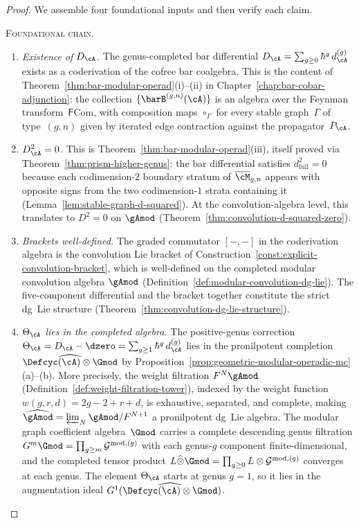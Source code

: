 \begin{proof}
We assemble four foundational inputs and then verify each
claim.

\medskip\noindent
\textsc{Foundational chain.}
\begin{enumerate}[label=\textup{(F\arabic*)}]
\item \emph{Existence of $D_\cA$.}
  The genus-completed bar differential
  $D_\cA = \sum_{g \geq 0} \hbar^g\, d_\cA^{(g)}$ exists as a
  coderivation of the cofree bar coalgebra.  This is the content
  of Theorem~\ref{thm:bar-modular-operad}(i)--(ii) in
  Chapter~\ref{chap:bar-cobar-adjunction}: the collection
  $\{\barB^{(g,n)}(\cA)\}$ is an algebra over the Feynman
  transform~$\mathsf{F}\mathrm{Com}$, with composition maps
  $\circ_\Gamma$ for every stable graph~$\Gamma$ of
  type~$(g,n)$ given by iterated edge contraction against
  the propagator~$P_\cA$.
\item \emph{$D_\cA^2 = 0$.}
  This is Theorem~\ref{thm:bar-modular-operad}(iii), itself
  proved via Theorem~\ref{thm:prism-higher-genus}:
  the bar differential satisfies $d_{\mathrm{full}}^2 = 0$
  because each codimension-$2$ boundary stratum of
  $\overline{\cM}_{g,n}$ appears with opposite signs from
  the two codimension-$1$ strata containing it
  (Lemma~\ref{lem:stable-graph-d-squared}).
  At the convolution-algebra level, this translates to
  $D^2 = 0$ on $\gAmod$
  (Theorem~\ref{thm:convolution-d-squared-zero}).
\item \emph{Brackets well-defined.}
  The graded commutator $[-,-]$ in the coderivation algebra
  is the convolution Lie bracket of
  Construction~\ref{const:explicit-convolution-bracket},
  which is well-defined on the completed modular convolution
  algebra $\gAmod$
  (Definition~\ref{def:modular-convolution-dg-lie}).
  The five-component differential and the bracket together
  constitute the strict dg~Lie structure
  (Theorem~\ref{thm:convolution-dg-lie-structure}).
\item \emph{$\Theta_\cA$ lies in the completed algebra.}
  The positive-genus correction $\Theta_\cA = D_\cA - \dzero
  = \sum_{g \geq 1} \hbar^g\, d_\cA^{(g)}$ lies in the
  pronilpotent completion
  $\widehat{\Defcyc(\cA) \otimes \Gmod}$
  by Proposition~\ref{prop:geometric-modular-operadic-mc}(a)--(b).
  More precisely, the weight filtration $F^N\gAmod$
  (Definition~\ref{def:weight-filtration-tower}), indexed by
  the weight function $w(g,r,d) = 2g - 2 + r + d$,
  is exhaustive, separated, and complete, making
  $\widehat{\gAmod} = \varprojlim_N \gAmod/F^{N+1}$
  a pronilpotent dg~Lie algebra.
  The modular graph coefficient algebra~$\Gmod$ carries a
  complete descending genus filtration
  $G^m\Gmod = \prod_{g \geq m} \mathcal{G}^{\mathrm{mod},(g)}$
  with each genus-$g$ component finite-dimensional, and the
  completed tensor product
  $L \widehat{\otimes} \Gmod = \prod_{g \geq 0}
  L \otimes \mathcal{G}^{\mathrm{mod},(g)}$ converges at each genus.
  The element $\Theta_\cA$ starts at genus $g = 1$,
  so it lies in the augmentation ideal
  $G^1(\widehat{\Defcyc(\cA) \otimes \Gmod})$.
\end{enumerate}


\end{proof}

